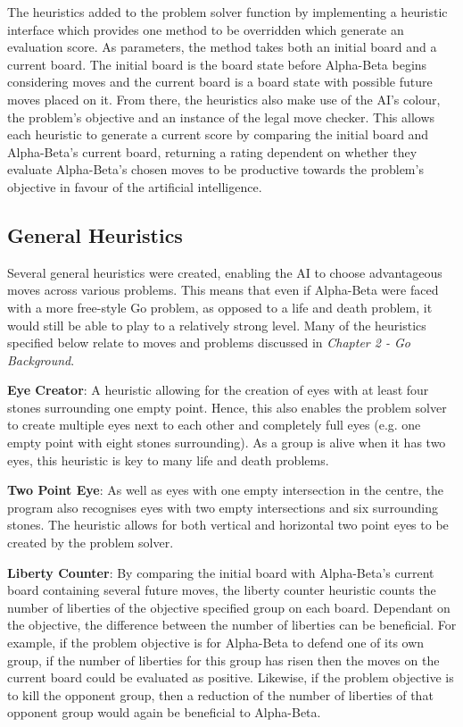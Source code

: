\documentclass{l3proj}
\begin{document}
The heuristics added to the problem solver function by implementing a heuristic interface which provides one method to be overridden which generate an evaluation score. As parameters, the method takes both an initial board and a current board. The initial board is the board state before Alpha-Beta begins considering moves and the current board is a board state with possible future moves placed on it. From there, the heuristics also make use of the AI's colour, the problem's objective and an instance of the legal move checker. This allows each heuristic to generate a current score by comparing the initial board and Alpha-Beta's current board, returning a rating dependent on whether they evaluate Alpha-Beta's chosen moves to be productive towards the problem's objective in favour of the artificial intelligence.

\subsection{General Heuristics}

Several general heuristics were created, enabling the AI to choose advantageous moves across various problems. This means that even if Alpha-Beta were faced with a more free-style Go problem, as opposed to a life and death problem, it would still be able to play to a relatively strong level. Many of the heuristics specified below relate to moves and problems discussed in \textit{Chapter 2 - Go Background}.

\textbf{Eye Creator}: A heuristic allowing for the creation of eyes with at least four stones surrounding one empty point. Hence, this also enables the problem solver to create multiple eyes next to each other and completely full eyes (e.g. one empty point with eight stones surrounding). As a group is alive when it has two eyes, this heuristic is key to many life and death problems.

\textbf{Two Point Eye}: As well as eyes with one empty intersection in the centre, the program also recognises eyes with two empty intersections and six surrounding stones. The heuristic allows for both vertical and horizontal two point eyes to be created by the problem solver.

\textbf{Liberty Counter}: By comparing the initial board with Alpha-Beta's current board containing several future moves, the liberty counter heuristic counts the number of liberties of the objective specified group on each board. Dependant on the objective, the difference between the number of liberties can be beneficial. For example, if the problem objective is for Alpha-Beta to defend one of its own group, if the number of liberties for this group has risen then the moves on the current board could be evaluated as positive. Likewise, if the problem objective is to kill the opponent group, then a reduction of the number of liberties of that opponent group would again be beneficial to Alpha-Beta.
\end{document}
